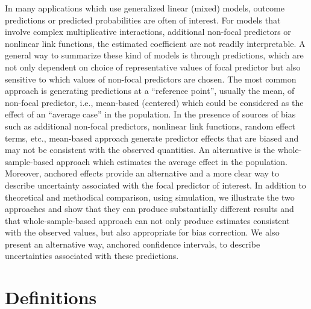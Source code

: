 \documentclass[10pt,letterpaper]{article}
\begin{document}
In many applications which use generalized linear (mixed) models, outcome predictions or predicted probabilities are often of interest. For models that involve complex multiplicative interactions, additional non-focal predictors or nonlinear link functions, the estimated coefficient are not readily interpretable. A general way to summarize these kind of models is through predictions, which are not only dependent on choice of representative values of focal predictor but also sensitive to which values of non-focal predictors are chosen. The most common approach is generating predictions at a ``reference point'', usually the mean, of non-focal predictor, i.e., mean-based (centered) which could be considered as the effect of an ``average case'' in the population. In the presence of sources of bias such as additional non-focal predictors, nonlinear link functions, random effect terms, etc., mean-based approach generate predictor effects that are biased and may not be consistent with the observed quantities. An alternative is the whole-sample-based approach which estimates the average effect in the population. Moreover, anchored effects provide an alternative and a more clear way to describe uncertainty associated with the focal predictor of interest. In addition to theoretical and methodical comparison, using simulation, we illustrate the two approaches and show that they can produce substantially different results and that whole-sample-based approach can not only produce estimates consistent with the observed values, but also appropriate for bias correction. We also present an alternative way, anchored confidence intervals, to describe uncertainties associated with these predictions.

\section*{Definitions}
\end{document}
